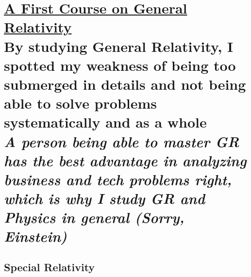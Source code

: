 



    \part{
        \href{https://trello.com/c/jzmmeXHp}{A First Course on General Relativity}
        \\[\bigskipamount]
        \large By studying General Relativity, I spotted my weakness of being too submerged in details and not being able to solve problems systematically and as a whole
        \\[\bigskipamount]
        \large \textit{A person being able to master GR has the best advantage in analyzing business and tech problems right, which is why I study GR and Physics in general (Sorry, Einstein)}
    }

    \chapter{Special Relativity}

    

